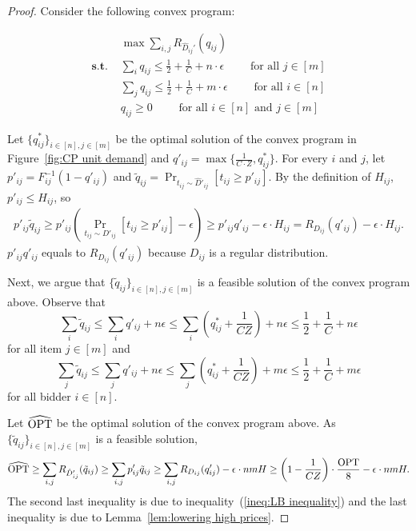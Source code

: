 \begin{proof}
Consider the following convex program:

\begin{minipage}{\textwidth} 
\begin{align*}
&\max \sum_{i,j} R_{\hat{D}_{ij}'}(q_{ij})\\
\textbf{s.t. }& \sum_i q_{ij}\leq \frac{1}{2} + \frac{1}{C} +n\cdot\epsilon\qquad \text{ for all $j\in[m]$}\\
& \sum_j q_{ij}\leq \frac{1}{2}+\frac{1}{C} +m\cdot\epsilon \qquad \text{ for all $i\in[n]$}\\
& q_{ij}\geq 0\qquad \text{ for all $i\in[n]$ and $j\in[m]$}
\end{align*}
\end{minipage}
\vspace{.1in}

Let $\{q_{ij}^*\}_{i\in[n], j\in[m]}$ be the optimal solution of the convex program in Figure~\ref{fig:CP unit demand} and $q'_{ij}=\max\{\frac{1}{C\cdot Z}, q^*_{ij}\}$. For every $i$ and $j$, let $p'_{ij}=F^{-1}_{ij}(1-q'_{ij})$ and $\tilde{q}_{ij} = \Pr_{t_{ij}\sim \hat{D}'_{ij}}\left[t_{ij}\geq p'_{ij}\right]$. By the definition of $H_{ij}$, $p'_{ij}\leq H_{ij}$, so \begin{align}\label{ineq:LB inequality}
p'_{ij}\tilde{q}_{ij}\geq p'_{ij}\left(\Pr_{t_{ij}\sim {D}'_{ij}}\left[t_{ij}\geq p'_{ij}\right]-\epsilon\right)\geq p'_{ij} q'_{ij}-\epsilon\cdot H_{ij}=R_{D_{ij}}(q'_{ij})-\epsilon\cdot H_{ij}.
 \end{align}
$p'_{ij} q'_{ij}$ equals to $R_{D_{ij}}(q'_{ij})$ because $D_{ij}$ is a regular distribution.

Next, we argue that $\{\tilde{q}_{ij}\}_{i\in[n],j\in[m]}$ is a feasible solution of the convex program above. Observe that $$\sum_{i} \tilde{q}_{ij} \leq \sum_i q'_{ij}+n\epsilon \leq \sum_i \left(q^*_{ij}+\frac{1}{CZ}\right)+n\epsilon\leq \frac{1}{2} + \frac{1}{C} +n\epsilon$$ for all item $j\in[m]$ and $$\sum_{j} \tilde{q}_{ij} \leq \sum_j q'_{ij}+n\epsilon \leq \sum_j \left(q^*_{ij}+\frac{1}{CZ}\right)+m\epsilon\leq \frac{1}{2}+\frac{1}{C} +m\epsilon$$ for all bidder $i\in[n]$. 

 Let $\widehat{\text{OPT}}$ be the optimal solution of the convex program above. As $\{\tilde{q}_{ij}\}_{i\in[n],j\in[m]}$ is a feasible solution,
$$\widehat{\text{OPT}}\geq \sum_{i,j} R_{\hat{D}_{ij}'}(\tilde{q}_{ij})\geq \sum_{i,j} p'_{ij}\tilde{q}_{ij}\geq \sum_{i,j} R_{D_{ij}}(q'_{ij})-\epsilon\cdot nmH\geq \left(1-\frac{1}{ CZ}\right)\cdot \frac{\text{OPT}}{8}-\epsilon\cdot nmH.$$
The second last inequality is due to inequality~(\ref{ineq:LB inequality}) and the last inequality is due to Lemma~\ref{lem:lowering high prices}.


\end{proof}
